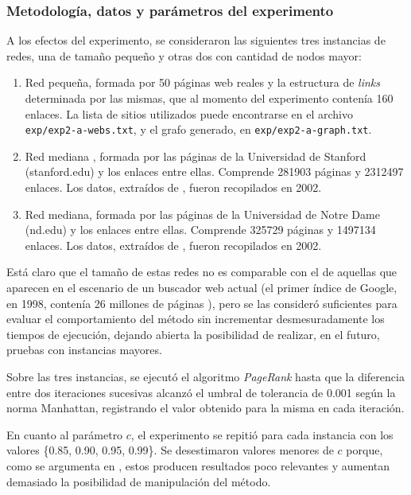             \subsubsection*{Metodología, datos y parámetros del experimento}
            A los efectos del experimento, se consideraron las siguientes tres instancias de redes, una de tamaño pequeño y otras dos con cantidad de nodos mayor:
            \begin{enumerate}[label=(\alph*)]
                \item Red pequeña, formada por 50 páginas web reales y la estructura de \emph{links} determinada por las mismas, que al momento del experimento contenía 160 enlaces. La lista de sitios utilizados puede encontrarse en el archivo \texttt{exp/exp2-a-webs.txt}, y el grafo generado, en \texttt{exp/exp2-a-graph.txt}.

                \item Red mediana , formada por las páginas de la Universidad de Stanford (stanford.edu) y los enlaces entre ellas. Comprende 281903 páginas y 2312497 enlaces. Los datos, extraídos de \cite{SNAP}, fueron recopilados en 2002.

                \item Red mediana, formada por las páginas de la Universidad de Notre Dame (nd.edu) y los enlaces entre ellas. Comprende 325729 páginas y 1497134 enlaces. Los datos, extraídos de \cite{SNAP}, fueron recopilados en 2002.
            \end{enumerate}

            Está claro que el tamaño de estas redes no es comparable con el de aquellas que aparecen en el escenario de un buscador web actual (el primer índice de Google, en 1998, contenía 26 millones de páginas \cite{Brin1998}), pero se las consideró suficientes para evaluar el comportamiento del método sin incrementar desmesuradamente los tiempos de ejecución, dejando abierta la posibilidad de realizar, en el futuro, pruebas con instancias mayores.

            Sobre las tres instancias, se ejecutó el algoritmo \emph{PageRank} hasta que la diferencia entre dos iteraciones sucesivas alcanzó el umbral de tolerancia de 0.001 según la norma Manhattan, registrando el valor obtenido para la misma en cada iteración.

            En cuanto al parámetro $c$, el experimento se repitió para cada instancia con los valores \{0.85, 0.90, 0.95, 0.99\}. Se desestimaron valores menores de $c$ porque, como se argumenta en \cite{Kamvar2003}, estos producen resultados poco relevantes y aumentan demasiado la posibilidad de manipulación del método.

